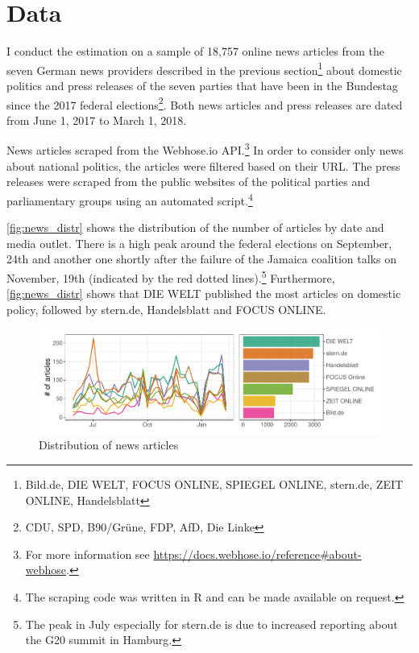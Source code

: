 \documentclass[
]{article}
\begin{document}
\hypertarget{data}{%
\section{Data}\label{data}}

I conduct the estimation on a sample of 18,757 online news articles from
the seven German news providers described in the previous
section\footnote{Bild.de, DIE WELT, FOCUS ONLINE, SPIEGEL ONLINE,
  stern.de, ZEIT ONLINE, Handelsblatt} about domestic politics and press
releases of the seven parties that have been in the Bundestag since the
2017 federal elections\footnote{CDU, SPD, B90/Grüne, FDP, AfD, Die Linke}.
Both news articles and press releases are dated from June 1, 2017 to
March 1, 2018.

News articles scraped from the Webhose.io API.\footnote{For more
  information see
  \url{https://docs.webhose.io/reference\#about-webhose}.} In order to
consider only news about national politics, the articles were filtered
based on their URL. The press releases were scraped from the public
websites of the political parties and parliamentary groups using an
automated script.\footnote{The scraping code was written in R and can be
  made available on request.}

\autoref{fig:news_distr} shows the distribution of the number of
articles by date and media outlet. There is a high peak around the
federal elections on September, 24th and another one shortly after the
failure of the Jamaica coalition talks on November, 19th (indicated by
the red dotted lines).\footnote{The peak in July especially for stern.de
  is due to increased reporting about the G20 summit in Hamburg.}
Furthermore, \autoref{fig:news_distr} shows that DIE WELT published the
most articles on domestic policy, followed by stern.de, Handelsblatt and
FOCUS ONLINE.

\begin{figure}

{\centering \includegraphics[width=0.7\linewidth]{main_text_files/figure-latex/Distribution of news articles-1} 

}

\caption{Distribution of news articles \label{fig:news_distr}}\label{fig:Distribution of news articles}
\end{figure}
\end{document}
